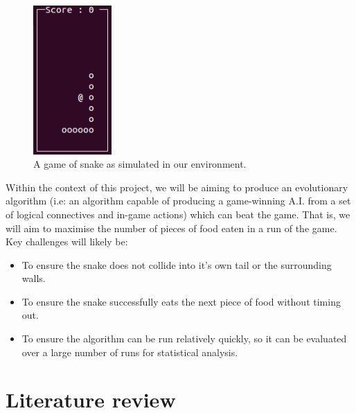\documentclass[british,10pt,a4paper]{article}
\begin{document}
\begin{minipage}{0.28\textwidth}
	\begin{figure}[H]
	\centering
		\includegraphics[width=3cm,keepaspectratio]{images/snake.png}
		\caption{A game of snake as simulated in our environment.}
		\label{fig:snake}
	\end{figure}
\end{minipage}

Within the context of this project, we will be aiming to produce an evolutionary algorithm (i.e: an algorithm capable of producing a game-winning A.I. from a set of logical connectives and in-game actions) which can beat the game. That is, we will aim to maximise the number of pieces of food eaten in a run of the game. Key challenges will likely be:
\begin{itemize}
	\item To ensure the snake does not collide into it's own tail or the surrounding walls.
	\item To ensure the snake successfully eats the next piece of food without timing out.
	\item To ensure the algorithm can be run relatively quickly, so it can be evaluated over a large number of runs for statistical analysis.
\end{itemize}

\section{Literature review}
\end{document}
